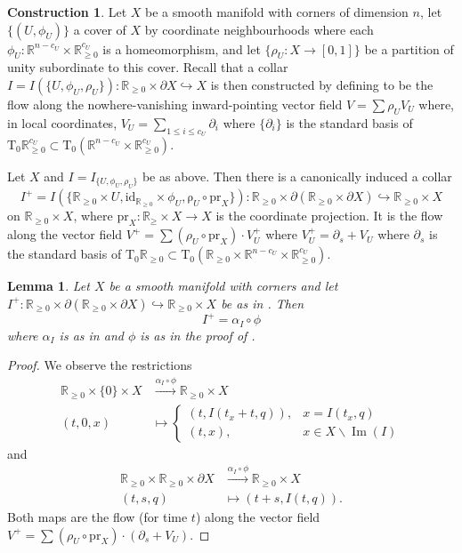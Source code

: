 \documentclass[]{amsart}
\newcommand{\mrm}[1]{\mathrm{#1}}
\newcommand{\mbb}[1]{\mathbb{#1}}
\newcommand{\R}{\mbb{R}}
\DeclareMathOperator{\Imm}{Im}
\newcommand{\id}{\mathrm{id}}
\newcommand{\Tangent}{\mathrm{T}}
\numberwithin{equation}{section}
\theoremstyle{definition}
\newtheorem{construction}[equation]{Construction}
\theoremstyle{remark}
\theoremstyle{plain}
\newtheorem{lemma}[equation]{Lemma}
\begin{document}
\begin{construction}\label{O6BEXS3}
    Let $X$ be a smooth manifold with corners of dimension $n$, let $\{(U,\phi_U)\}$ a cover of $X$ by coordinate neighbourhoods where each $\phi_U\colon\R^{n-c_U}\times\R^{c_U}_{\geq0}$ is a homeomorphism, and let $\{\rho_U\colon X\to[0,1]\}$ be a partition of unity subordinate to this cover. Recall that a collar $I=I(\{U,\phi_U,\rho_U\})\colon \R_{\geq0}\times\partial X\hookrightarrow X$ is then constructed by defining to be the flow along the nowhere-vanishing inward-pointing vector field $V=\sum\rho_U V_U$ where, in local coordinates, $V_U=\sum_{1\leq i\leq c_U}\partial_i$ where $\{\partial_i\}$ is the standard basis of $\Tangent_0\R^{c_U}_{\geq0}\subset\Tangent_0(\R^{n-c_U}\times\R^{c_U}_{\geq0})$. 

    Let $X$ and $I=I_{\{U,\phi_U,\rho_U\}}$ be as above. Then there is a canonically induced a collar 
    \[
        I^+=I(\{\R_{\geq0}\times U,\id_{\R_{\geq0}}\times\phi_U,\mrm\rho_U\circ\mrm{pr}_X\})\colon \R_{\geq0}\times\partial(\R_{\geq0}\times\partial X)\hookrightarrow \R_{\geq0}\times X
    \] 
    on $\R_{\geq0}\times X$, where $\mrm{pr}_X\colon \R_{\geq}\times X\to X$ is the coordinate projection. It is the flow along the vector field $V^+=\sum(\rho_U\circ\mrm{pr}_X)\cdot V_U^+$ where $V_U^+=\partial_s+V_U$ where $\partial_s$ is the standard basis of $\Tangent_0\R_{\geq0}\subset\Tangent_0(\R_{\geq0}\times\R^{n-c_U}\times\R^{c_U}_{\geq0})$.
\end{construction}

\begin{lemma}
    Let $X$ be a smooth manifold with corners and let $I^+\colon\R_{\geq0}\times \partial(\R_{\geq0}\times\partial X)\hookrightarrow\R_{\geq0}\times X$ be as in . Then 
    \[
        I^+=\alpha_I\circ\phi
    \]
    where $\alpha_I$ is as in  and $\phi$ is as in the proof of .
\end{lemma}
\begin{proof}
    We observe the restrictions 
    \begin{align*}
        \R_{\geq0}\times\{0\}\times X&\xrightarrow{\alpha_I\circ\phi}\R_{\geq0}\times X\\
        (t,0,x)&\mapsto \begin{cases}
            (t,I(t_x+t,q)), & x=I(t_x,q)\\
            (t,x), & x\in X\smallsetminus\Imm(I)
        \end{cases}
    \end{align*}
    and
    \begin{align*}
        \R_{\geq0}\times\R_{\geq0}\times\partial X&\xrightarrow{\alpha_I\circ \phi} \R_{\geq0} \times X\\
        (t,s,q)&\mapsto (t+s,I(t,q)).
    \end{align*}
    Both maps are the flow (for time $t$) along the vector field $V^+=\sum(\rho_U\circ\mrm{pr}_X)\cdot(\partial_s+V_U)$.
\end{proof}
\end{document}
